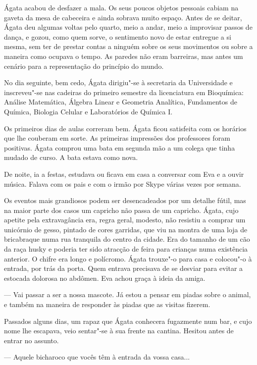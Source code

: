 Ágata acabou de desfazer a mala. Os seus poucos objetos pessoais
cabiam na gaveta da mesa de cabeceira e ainda sobrava muito espaço.
Antes de se deitar, Ágata deu algumas voltas pelo quarto, meio a andar,
meio a improvisar passos de dança, e gozou, como quem sorve, o
sentimento novo de estar entregue a si mesma, sem ter de prestar contas
a ninguém sobre os seus movimentos ou sobre a maneira como ocupava o
tempo. As paredes não eram barreiras, mas antes um cenário para a
representação do princípio do mundo.


No dia seguinte, bem cedo, Ágata dirigiu"-se à secretaria da Universidade
e inscreveu"-se nas cadeiras do primeiro semestre da licenciatura em
Bioquímica: Análise Matemática, Álgebra Linear e Geometria Analítica,
Fundamentos de Química, Biologia Celular e Laboratórios de Química I.

Os primeiros dias de aulas correram bem. Ágata ficou satisfeita com os
horários que lhe couberam em sorte. As primeiras impressões dos
professores foram positivas. Ágata comprou uma bata em segunda mão a um
colega que tinha mudado de curso. A bata estava como nova.

De noite, ia a festas, estudava ou ficava em casa a conversar com Eva
e a ouvir música. Falava com os pais e com o irmão por Skype várias
vezes por semana.

Os eventos mais grandiosos podem ser desencadeados por um detalhe fútil,
mas na maior parte dos casos um capricho não passa de um capricho.
Ágata, cujo apetite pela extravagância era, regra geral, modesto, não
resistiu a comprar um unicórnio de gesso, pintado de cores garridas, que
viu na montra de uma loja de bricabraque numa rua tranquila do centro
da cidade. Era do tamanho de um cão da raça husky e poderia ter sido
atracção de feira para crianças numa existência anterior. O chifre era
longo e polícromo. Ágata trouxe"-o para casa e colocou"-o à entrada, por
trás da porta. Quem entrava precisava de se desviar para evitar a
estocada dolorosa no abdômen. Eva achou graça à ideia da amiga.

--- Vai passar a ser a nossa mascote. Já estou a pensar em piadas sobre o
  animal, e também na maneira de responder às piadas que as visitas
  fizerem.

Passados alguns dias, um rapaz que Ágata conhecera fugazmente num bar,
e cujo nome lhe escapava, veio sentar"-se à sua frente na cantina.
Hesitou antes de entrar no assunto.

--- Aquele bicharoco que vocês têm à entrada da vossa casa...

